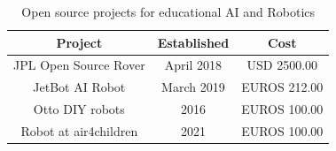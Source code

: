 \documentclass[sigconf]{acmart}
\begin{document}








\begin{table}
  \begin{tabular}{ccc}
    \toprule
    Project & Established  & Cost\\
    \midrule
    JPL Open Source Rover \cite{OSR:2018} & April 2018  &  USD 2500.00 \\
    JetBot AI Robot \cite{nanoJetBot:2019} & March 2019  & EUROS 212.00    \\
    Otto DIY robots \cite{OttoDIY:2016} & 2016 &  EUROS 100.00  \\
    Robot at air4children & 2021 & EUROS 100.00  \\
  \bottomrule
\end{tabular}
\caption{Open source projects for educational AI and Robotics}
\label{tab:opensourceprojects}
\end{table}
\end{document}
